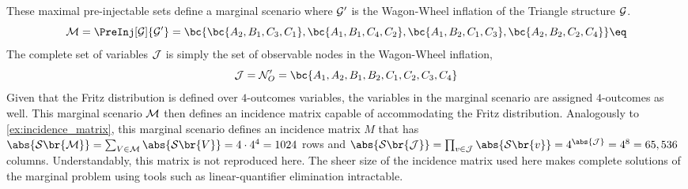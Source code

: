 \documentclass[aps, 10pt, english, twoside, pra, nofootinbib, tightenlines, longbibliography, superscriptaddress]{revtex4-1}
\renewcommand{\Events}[1]{\mathcal{S}\br{#1}} %
\begin{document}
    These maximal pre-injectable sets define a marginal scenario where $\mathcal{G}'$ is the Wagon-Wheel inflation of the Triangle structure $\mathcal{G}$.
    \[ \mscenario = \PreInj[\graph]{\graph'} = \bc{\bc{A_2, B_1, C_3, C_1}, \bc{A_1, B_1, C_4, C_2}, \bc{A_1, B_2, C_1, C_3}, \bc{A_2, B_2, C_2, C_4}} \eq \label{eq:wagon_wheel_marginal_model}\]
    The complete set of variables $\mathcal{J}$ is simply the set of observable nodes in the Wagon-Wheel inflation,
    \[ \jointvar = \nodes'_O = \bc{A_1, A_2, B_1, B_2, C_1, C_2, C_3, C_4} \]
    Given that the Fritz distribution is defined over $4$-outcomes variables, the variables in the marginal scenario are assigned $4$-outcomes as well. This marginal scenario $\mathcal{M}$ then defines an incidence matrix capable of accommodating the Fritz distribution.
    Analogously to \cref{ex:incidence_matrix}, this marginal scenario defines an incidence matrix $M$ that has $\abs{\Events{\mscenario}} = \sum_{V \in \mscenario} \abs{\Events{V}} = 4 \cdot 4^{4} = 1024$ rows and $\abs{\Events{\jointvar}} = \prod_{v \in \jointvar} \abs{\Events{v}} = 4^{\abs{\jointvar}} = 4^8 = 65,536$ columns. Understandably, this matrix is not reproduced here. The sheer size of the incidence matrix used here makes complete solutions of the marginal problem using tools such as linear-quantifier elimination intractable.
\end{document}

